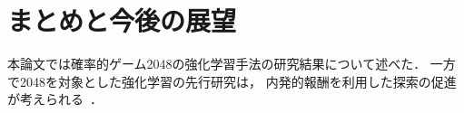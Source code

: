 \chapter{まとめと今後の展望}
本論文では確率的ゲーム2048の強化学習手法の研究結果について述べた．
一方で2048を対象とした強化学習の先行研究は， 
内発的報酬を利用した探索の促進が考えられる~\cite{RND}．